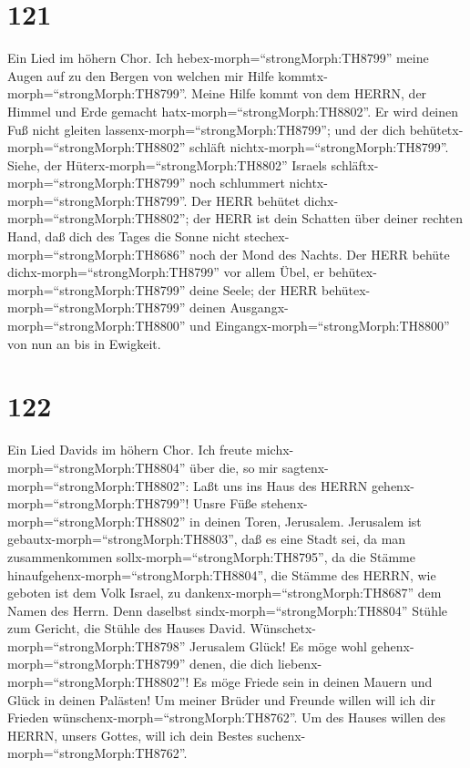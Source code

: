 \hypertarget{section-120}{%
\section{121}\label{section-120}}

 Ein Lied im höhern Chor. Ich
hebex-morph=``strongMorph:TH8799'' meine Augen auf zu den Bergen von
welchen mir Hilfe kommtx-morph=``strongMorph:TH8799''. 
Meine Hilfe kommt von dem HERRN, der Himmel und Erde gemacht
hatx-morph=``strongMorph:TH8802''.  Er wird deinen Fuß nicht
gleiten lassenx-morph=``strongMorph:TH8799''; und der dich
behütetx-morph=``strongMorph:TH8802'' schläft
nichtx-morph=``strongMorph:TH8799''.  Siehe, der
Hüterx-morph=``strongMorph:TH8802'' Israels
schläftx-morph=``strongMorph:TH8799'' noch schlummert
nichtx-morph=``strongMorph:TH8799''.  Der HERR behütet
dichx-morph=``strongMorph:TH8802''; der HERR ist dein Schatten über
deiner rechten Hand,  daß dich des Tages die Sonne nicht
stechex-morph=``strongMorph:TH8686'' noch der Mond des Nachts.
 Der HERR behüte dichx-morph=``strongMorph:TH8799'' vor
allem Übel, er behütex-morph=``strongMorph:TH8799'' deine Seele;
 der HERR behütex-morph=``strongMorph:TH8799'' deinen
Ausgangx-morph=``strongMorph:TH8800'' und
Eingangx-morph=``strongMorph:TH8800'' von nun an bis in Ewigkeit.

\hypertarget{section-121}{%
\section{122}\label{section-121}}

 Ein Lied Davids im höhern Chor. Ich freute
michx-morph=``strongMorph:TH8804'' über die, so mir
sagtenx-morph=``strongMorph:TH8802'': Laßt uns ins Haus des HERRN
gehenx-morph=``strongMorph:TH8799''!  Unsre Füße
stehenx-morph=``strongMorph:TH8802'' in deinen Toren, Jerusalem.
 Jerusalem ist gebautx-morph=``strongMorph:TH8803'', daß es
eine Stadt sei, da man zusammenkommen
sollx-morph=``strongMorph:TH8795'',  da die Stämme
hinaufgehenx-morph=``strongMorph:TH8804'', die Stämme des HERRN, wie
geboten ist dem Volk Israel, zu dankenx-morph=``strongMorph:TH8687'' dem
Namen des Herrn.  Denn daselbst
sindx-morph=``strongMorph:TH8804'' Stühle zum Gericht, die Stühle des
Hauses David.  Wünschetx-morph=``strongMorph:TH8798''
Jerusalem Glück! Es möge wohl gehenx-morph=``strongMorph:TH8799'' denen,
die dich liebenx-morph=``strongMorph:TH8802''!  Es möge
Friede sein in deinen Mauern und Glück in deinen Palästen! 
Um meiner Brüder und Freunde willen will ich dir Frieden
wünschenx-morph=``strongMorph:TH8762''.  Um des Hauses
willen des HERRN, unsers Gottes, will ich dein Bestes
suchenx-morph=``strongMorph:TH8762''.

